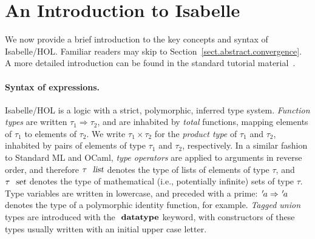 \section{An Introduction to Isabelle}
\label{subsect.an.overview.of.isabelle}

We now provide a brief introduction to the key concepts and syntax of Isabelle/HOL.
Familiar readers may skip to Section~\ref{sect.abstract.convergence}.
A more detailed introduction can be found in the standard tutorial material~\cite{DBLP:books/sp/NipkowK14}.

\paragraph{Syntax of expressions.}

Isabelle/HOL is a logic with a strict, polymorphic, inferred type system.
\emph{Function types} are written $\tau_1 \Rightarrow \tau_2$, and are inhabited by \emph{total} functions, mapping elements of $\tau_1$ to elements of $\tau_2$.
We write $\tau_1 \times \tau_2$ for the \emph{product type} of $\tau_1$ and $\tau_2$, inhabited by pairs of elements of type $\tau_1$ and $\tau_2$, respectively.
In a similar fashion to Standard ML and OCaml, \emph{type operators} are applied to arguments in reverse order, and therefore $\tau\ \isa{list}$ denotes the type of lists of elements of type $\tau$, and $\tau\ \isa{set}$ denotes the type of mathematical (i.e., potentially infinite) sets of type $\tau$.
Type variables are written in lowercase, and preceded with a prime: ${\emph{$\mskip2mu{'}\mskip-2mu$}}a \Rightarrow {\emph{$\mskip2mu{'}\mskip-2mu$}}a$ denotes the type of a polymorphic identity function, for example.
\emph{Tagged union} types are introduced with the $\isacommand{datatype}$ keyword, with constructors of these types usually written with an initial upper case letter.

